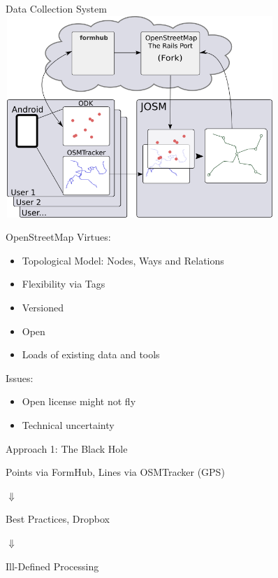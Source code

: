 \documentclass{beamer}
\begin{document}
\begin{frame}{Data Collection System}
  \includegraphics[width=4in,height=3in]{../diagrams/gridmaps-design.png}
\end{frame}

\begin{frame}{OpenStreetMap}
  Virtues:
  \begin{itemize}
  \item[] Topological Model:  Nodes, Ways and Relations
  \item[] Flexibility via Tags
  \item[] Versioned
  \item[] Open
  \item[] Loads of existing data and tools
  \end{itemize}


  \bigskip 

  Issues:
  \begin{itemize}
  \item[] Open license might not fly
  \item[] Technical uncertainty
  \end{itemize}

\end{frame}

\begin{frame}{Approach 1: The Black Hole}
  \begin{center}


  Points via FormHub, Lines via OSMTracker (GPS)
  
  $\Downarrow$ 
  
  Best Practices, Dropbox 
  
  $\Downarrow$ 
  
  Ill-Defined Processing 
  \end{center}

\end{frame}
\end{document}
